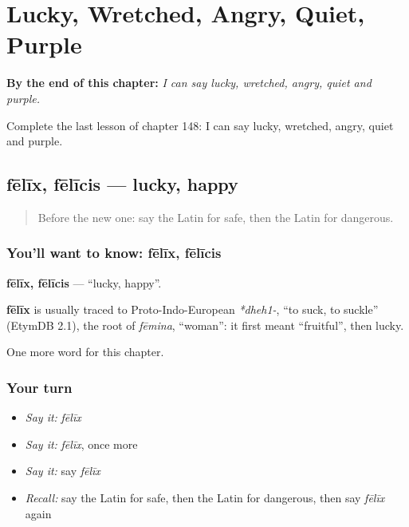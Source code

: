 
\chapter{Lucky, Wretched, Angry, Quiet, Purple}
\label{ch:la-lucky-wretched-angry-quiet-purple}

\begin{chapteropening}
\textbf{By the end of this chapter:} \emph{I can say lucky, wretched, angry, quiet and purple.}

Complete the last lesson of chapter 148: I can say lucky, wretched, angry, quiet and purple.
\end{chapteropening}

\section[fēlīx, fēlīcis]{fēlīx, fēlīcis — lucky, happy}

\label{lesson:LA-C148-felix}



\begin{quote}
Before the new one: say the Latin for safe, then the Latin for dangerous.
\end{quote}

\subsection*{You'll want to know: fēlīx, fēlīcis}
\textbf{fēlīx, fēlīcis} — \textquotedblleft{}lucky, happy\textquotedblright{}.

\begin{cousinweb}
\textbf{fēlīx} is usually traced to Proto-Indo-European \emph{*dheh1-}, \textquotedblleft{}to suck, to suckle\textquotedblright{} (EtymDB 2.1), the root of \emph{fēmina}, \textquotedblleft{}woman\textquotedblright{}: it first meant \textquotedblleft{}fruitful\textquotedblright{}, then lucky.
\end{cousinweb}

\begin{grammarlens}[title={What you've built}]
One more word for this chapter.
\end{grammarlens}

\subsection*{Your turn}
\begin{itemize}
\raggedright
  \item \emph{Say it:} \emph{fēlīx}
  \item \emph{Say it:} \emph{fēlīx}, once more
  \item \emph{Say it:} say \emph{fēlīx}
  \item \emph{Recall:} say the Latin for safe, then the Latin for dangerous, then say \emph{fēlīx} again
\end{itemize}

